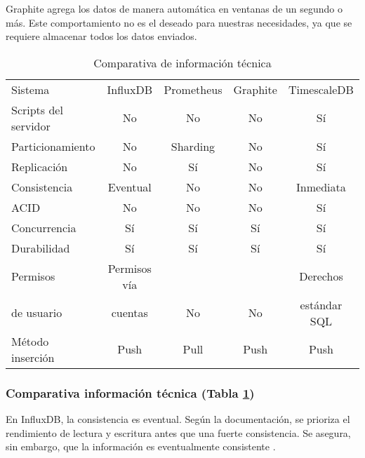 Graphite agrega los datos de manera automática en ventanas de un segundo o más. Este comportamiento no es el deseado 
para nuestras necesidades, ya que se requiere almacenar todos los datos enviados.

\begin{table}[]
    \begin{center}
        \begin{adjustbox}{max width=\textwidth}
            \begin{tabular}{l c c c c}
                \toprule
                Sistema & InfluxDB & Prometheus & Graphite & TimescaleDB \\
                \otoprule
                Scripts del servidor & No & No & No & Sí \\
                \rowcolor{gray!35}
                Particionamiento & No & Sharding & No & Sí \\
                Replicación & No & Sí & No & Sí \\
                \rowcolor{gray!35}
                Consistencia & Eventual & No & No & Inmediata \\
                ACID& No & No & No & Sí \\
                \rowcolor{gray!35}
                Concurrencia & Sí & Sí & Sí & Sí \\
                Durabilidad & Sí & Sí & Sí & Sí \\
                \rowcolor{gray!35}
                Permisos                   & Permisos vía    &                      &                      & Derechos \\
                \rowcolor{gray!35}
                de usuario & cuentas & \multirow{-2}{*}{No} & \multirow{-2}{*}{No} & estándar SQL \\
                Método inserción & Push & Pull & Push & Push \\
                \bottomrule
            \end{tabular}
        \end{adjustbox}
        \caption{Comparativa de información técnica}
        \label{tabla:tisgbd}
    \end{center}
\end{table}

\subsubsection{Comparativa información técnica (Tabla \ref{tabla:tisgbd})} En InfluxDB, la consistencia es eventual. Según
la documentación, se prioriza el rendimiento de lectura y escritura antes que una fuerte consistencia. Se asegura, sin 
embargo, que la información es eventualmente consistente \cite{influx:consistency}.


